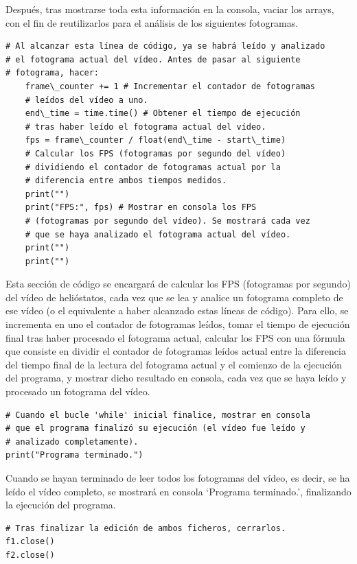 Después, tras mostrarse toda esta información en la consola, vaciar los arrays, con el fin de reutilizarlos para el análisis de los siguientes fotogramas.\\[20pt]

\begin{lstlisting}
# Al alcanzar esta línea de código, ya se habrá leído y analizado
# el fotograma actual del vídeo. Antes de pasar al siguiente
# fotograma, hacer:
    frame\_counter += 1 # Incrementar el contador de fotogramas
    # leídos del vídeo a uno.
    end\_time = time.time() # Obtener el tiempo de ejecución
    # tras haber leído el fotograma actual del vídeo.
    fps = frame\_counter / float(end\_time - start\_time)
    # Calcular los FPS (fotogramas por segundo del vídeo)
    # dividiendo el contador de fotogramas actual por la
    # diferencia entre ambos tiempos medidos.
    print("")
    print("FPS:", fps) # Mostrar en consola los FPS
    # (fotogramas por segundo del vídeo). Se mostrará cada vez
    # que se haya analizado el fotograma actual del vídeo.
    print("")
    print("")
\end{lstlisting}

Esta sección de código se encargará de calcular los FPS (fotogramas por segundo) del vídeo de helióstatos, cada vez que se lea y analice un fotograma completo de ese vídeo (o el equivalente a haber alcanzado estas líneas de código). Para ello, se incrementa en uno el contador de fotogramas leídos, tomar el tiempo de ejecución final tras haber procesado el fotograma actual, calcular los FPS con una fórmula que consiste en dividir el contador de fotogramas leídos actual entre la diferencia del tiempo final de la lectura del fotograma actual y el comienzo de la ejecución del programa, y mostrar dicho resultado en consola, cada vez que se haya leído y procesado un fotograma del vídeo.\\[20pt]

\begin{lstlisting}
# Cuando el bucle 'while' inicial finalice, mostrar en consola
# que el programa finalizó su ejecución (el vídeo fue leído y
# analizado completamente).
print("Programa terminado.")
\end{lstlisting}

Cuando se hayan terminado de leer todos los fotogramas del vídeo, es decir, se ha leído el vídeo completo, se mostrará en consola ‘Programa terminado.’, finalizando la ejecución del programa.\\[20pt]

\begin{lstlisting}
# Tras finalizar la edición de ambos ficheros, cerrarlos.
f1.close()
f2.close()
\end{lstlisting}


